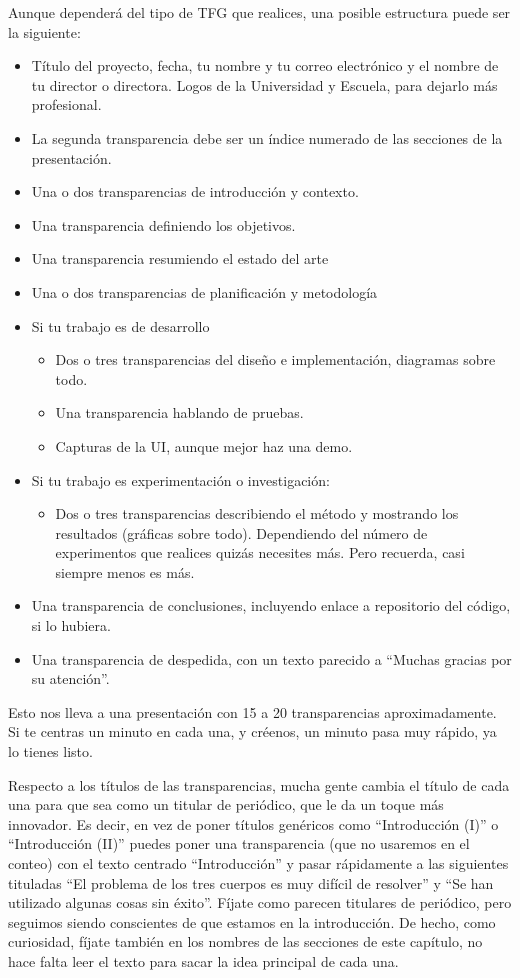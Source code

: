 Aunque dependerá del tipo de TFG que realices, una posible estructura puede ser la siguiente:
\begin{itemize}
\item Título del proyecto, fecha, tu nombre y tu correo electrónico y el nombre de tu director o directora. Logos de la Universidad y Escuela, para dejarlo más profesional.
\item La segunda transparencia debe ser un índice numerado de las secciones de la presentación.
\item Una o dos transparencias de introducción y contexto.
\item Una transparencia definiendo los objetivos.
\item Una transparencia resumiendo el estado del arte
\item Una o dos transparencias de planificación y metodología
\item Si tu trabajo es de desarrollo
    \begin{itemize}
    \item Dos o tres transparencias del diseño e implementación, diagramas sobre todo.
    \item Una transparencia hablando de pruebas.
    \item Capturas de la UI, aunque mejor haz una demo.
    \end{itemize}
\item Si tu trabajo es experimentación o investigación:
    \begin{itemize}
        \item Dos o tres transparencias describiendo el método y mostrando los resultados (gráficas sobre todo). Dependiendo del número de experimentos que realices quizás necesites más. Pero recuerda, casi siempre menos es más.
    \end{itemize}
\item Una transparencia de conclusiones, incluyendo enlace a repositorio del código, si lo hubiera.
\item Una transparencia de despedida, con un texto parecido a ``Muchas gracias por su atención''.
\end{itemize}

Esto nos lleva a una presentación con 15 a 20 transparencias aproximadamente. Si te centras un minuto en cada una, y créenos, un minuto pasa muy rápido, ya lo tienes listo.

Respecto a los títulos de las transparencias, mucha gente cambia el título de cada una para que sea como un titular de periódico, que le da un toque más innovador.  Es decir, en vez de poner títulos genéricos como ``Introducción (I)'' o ``Introducción (II)'' puedes poner una transparencia (que no usaremos en el conteo) con el texto centrado ``Introducción'' y pasar rápidamente a las siguientes tituladas ``El problema de los tres cuerpos es muy difícil de resolver'' y ``Se han utilizado algunas cosas sin éxito''. Fíjate como parecen titulares de periódico, pero seguimos siendo conscientes de que estamos en la introducción. De hecho, como curiosidad, fíjate también en los nombres de las secciones de este capítulo, no hace falta leer el texto para sacar la idea principal de cada una.

